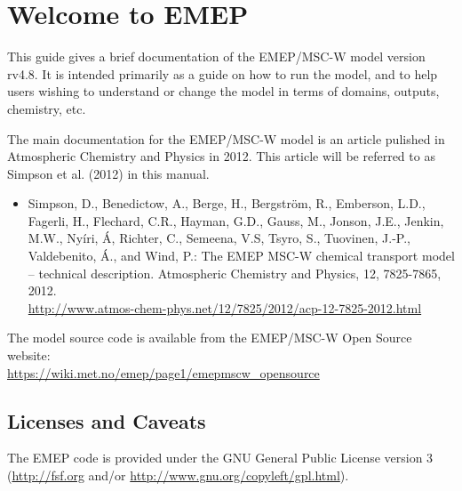 
\chapter{Welcome to EMEP }

This guide gives a brief documentation of the EMEP/MSC-W model
version rv4.8. 
It is intended primarily as a guide on how to run the model, and
to help users wishing to understand or change 
the model in terms of domains, outputs, chemistry, etc.


The main documentation for the EMEP/MSC-W model is an article pulished 
in Atmospheric Chemistry and Physics in 2012. 
This article will be referred to as Simpson et al. (2012) in
this manual. 


\begin{itemize}
\item
Simpson, D., Benedictow, A., Berge, H., Bergstr\"om, R., Emberson, L.D., Fagerli, H., Flechard, C.R., Hayman, G.D., Gauss, M., Jonson, J.E., Jenkin, M.W., Ny\'iri, \'A, Richter, C., Semeena, V.S, Tsyro, S., Tuovinen, J.-P., Valdebenito, \'A., and Wind, P.:
The EMEP MSC-W chemical transport model – technical description.  
Atmospheric Chemistry and Physics, 12, 7825-7865, 2012. \\
\url{http://www.atmos-chem-phys.net/12/7825/2012/acp-12-7825-2012.html}
\end{itemize}


The model source code is available from the EMEP/MSC-W Open Source website:\\ 
\url{https://wiki.met.no/emep/page1/emepmscw_opensource}

\newpage

\section{Licenses and Caveats}

The EMEP code is provided under the GNU General Public License version 3
(\url{http://fsf.org} and/or
\url{http://www.gnu.org/copyleft/gpl.html}).


